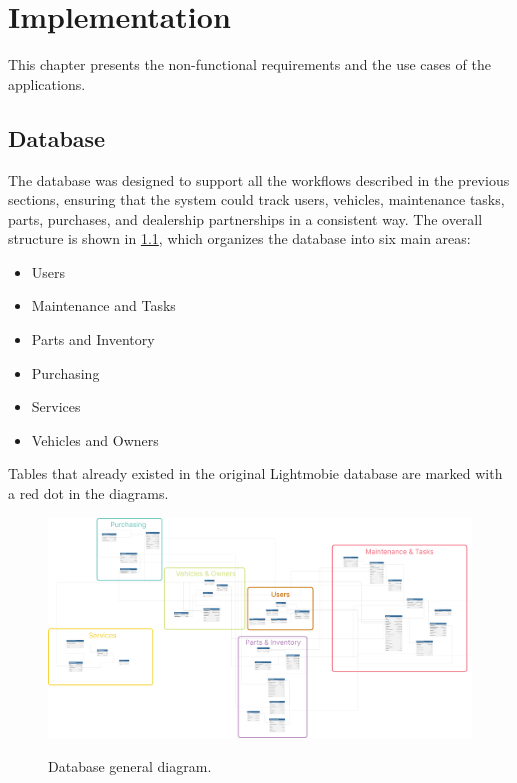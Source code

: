 \chapter{Implementation}%
\label{chapter:methodology}

\begin{introduction}
This chapter presents the non-functional requirements and the use cases of the applications. 
\end{introduction} 


\section{Database} 


The database was designed to support all the workflows described in the previous sections, ensuring that the system could track users, vehicles, maintenance tasks, parts, purchases, and dealership partnerships in a consistent way. The overall structure is shown in \ref{fig:dbGeneral}, which organizes the database into six main areas:
 
\begin{itemize}
  \item Users
  \item Maintenance and Tasks
  \item Parts and Inventory 
  \item Purchasing
  \item Services
  \item Vehicles and Owners
\end{itemize}

Tables that already existed in the original Lightmobie database are marked with a red dot in the diagrams.

\begin{figure}[h]
  \caption{Database general diagram.}
  \centering
  \includegraphics[width=\textwidth]{figs/dbDiagrams/DbDiagramFull}
  \label{fig:dbGeneral} 
\end{figure}



